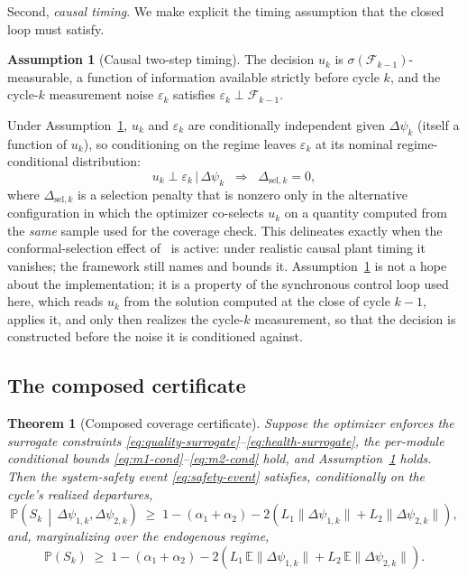 \documentclass[review,12pt]{elsarticle}
\newtheorem{theorem}{Theorem}
\theoremstyle{definition}
\newtheorem{assumption}{Assumption}
\begin{document}
Second, \emph{causal timing}. We make explicit the timing assumption that the
closed loop must satisfy.
\begin{assumption}[Causal two-step timing]
\label{ass:causal}
The decision $u_k$ is $\sigma(\mathcal{F}_{k-1})$-measurable, a function of
information available strictly before cycle $k$, and the cycle-$k$ measurement
noise $\varepsilon_k$ satisfies $\varepsilon_k \perp \mathcal{F}_{k-1}$.
\end{assumption}
Under Assumption~\ref{ass:causal}, $u_k$ and $\varepsilon_k$ are conditionally
independent given $\Delta\psi_k$ (itself a function of $u_k$), so conditioning on
the regime leaves $\varepsilon_k$ at its nominal regime-conditional distribution:
\begin{equation}
u_k \perp \varepsilon_k \,\big|\, \Delta\psi_k \;\;\Longrightarrow\;\; \Delta_{\mathrm{sel},k} = 0,
\label{eq:no-selection}
\end{equation}
where $\Delta_{\mathrm{sel},k}$ is a selection penalty that is nonzero only in the
alternative configuration in which the optimizer co-selects $u_k$ on a quantity
computed from the \emph{same} sample used for the coverage check. This delineates
exactly when the conformal-selection effect of~\citet{busico_m3} is active: under
realistic causal plant timing it vanishes; the framework still names and bounds
it. Assumption~\ref{ass:causal} is not a hope about the implementation; it is a
property of the synchronous control loop used here, which reads $u_k$ from the
solution computed at the close of cycle $k-1$, applies it, and only then realizes
the cycle-$k$ measurement, so that the decision is constructed before the noise it
is conditioned against.

\subsection{The composed certificate}
\label{sec:theorem}

\begin{theorem}[Composed coverage certificate]
\label{thm:composed}
Suppose the optimizer enforces the surrogate constraints
\eqref{eq:quality-surrogate}--\eqref{eq:health-surrogate}, the per-module
conditional bounds \eqref{eq:m1-cond}--\eqref{eq:m2-cond} hold, and
Assumption~\ref{ass:causal} holds. Then the system-safety event
\eqref{eq:safety-event} satisfies, conditionally on the cycle's realized
departures,
\begin{equation}
\mathbb{P}\!\left(S_k \,\middle|\, \Delta\psi_{1,k}, \Delta\psi_{2,k}\right)
\;\ge\; 1 - (\alpha_1 + \alpha_2)
       - 2\!\left(L_1\|\Delta\psi_{1,k}\| + L_2\|\Delta\psi_{2,k}\|\right),
\label{eq:certificate-cond}
\end{equation}
and, marginalizing over the endogenous regime,
\begin{equation}
\mathbb{P}(S_k) \;\ge\; 1 - (\alpha_1 + \alpha_2)
       - 2\!\left(L_1\,\mathbb{E}\|\Delta\psi_{1,k}\| + L_2\,\mathbb{E}\|\Delta\psi_{2,k}\|\right).
\label{eq:certificate-marg}
\end{equation}
\end{theorem}
\end{document}

